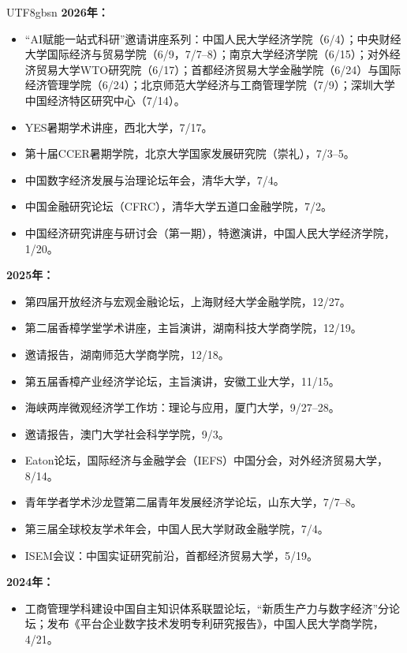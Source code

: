 \documentclass[letterpaper]{article}
\begin{document}
\begin{CJK}{UTF8}{gbsn}
\vspace{0.6em}
\textbf{2026年：}
\begin{itemize}[leftmargin=1.6em, itemsep=0.25em, topsep=0.2em]
  \item “AI赋能一站式科研”邀请讲座系列：中国人民大学经济学院（6/4）；中央财经大学国际经济与贸易学院（6/9，7/7--8）；南京大学经济学院（6/15）；对外经济贸易大学WTO研究院（6/17）；首都经济贸易大学金融学院（6/24）与国际经济管理学院（6/24）；北京师范大学经济与工商管理学院（7/9）；深圳大学中国经济特区研究中心（7/14）。
  \item YES暑期学术讲座，西北大学，7/17。
  \item 第十届CCER暑期学院，北京大学国家发展研究院（崇礼），7/3--5。
  \item 中国数字经济发展与治理论坛年会，清华大学，7/4。
  \item 中国金融研究论坛（CFRC），清华大学五道口金融学院，7/2。
  \item 中国经济研究讲座与研讨会（第一期），特邀演讲，中国人民大学经济学院，1/20。
\end{itemize}

\textbf{2025年：}
\begin{itemize}[leftmargin=1.6em, itemsep=0.25em, topsep=0.2em]
  \item 第四届开放经济与宏观金融论坛，上海财经大学金融学院，12/27。
  \item 第二届香樟学堂学术讲座，主旨演讲，湖南科技大学商学院，12/19。
  \item 邀请报告，湖南师范大学商学院，12/18。
  \item 第五届香樟产业经济学论坛，主旨演讲，安徽工业大学，11/15。
  \item 海峡两岸微观经济学工作坊：理论与应用，厦门大学，9/27--28。
  \item 邀请报告，澳门大学社会科学学院，9/3。
  \item Eaton论坛，国际经济与金融学会（IEFS）中国分会，对外经济贸易大学，8/14。
  \item 青年学者学术沙龙暨第二届青年发展经济学论坛，山东大学，7/7--8。
  \item 第三届全球校友学术年会，中国人民大学财政金融学院，7/4。
  \item ISEM会议：中国实证研究前沿，首都经济贸易大学，5/19。
\end{itemize}

\textbf{2024年：}
\begin{itemize}[leftmargin=1.6em, itemsep=0.25em, topsep=0.2em]
  \item 工商管理学科建设中国自主知识体系联盟论坛，“新质生产力与数字经济”分论坛；发布《平台企业数字技术发明专利研究报告》，中国人民大学商学院，4/21。
\end{itemize}


\end{CJK}
\end{document}
